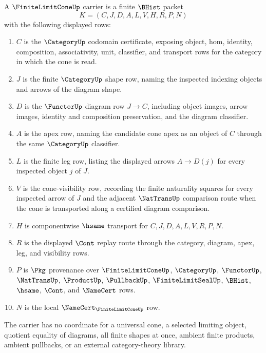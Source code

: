 \begin{definition}
\label{def:finite-limit-cone-carrier}
A $\FiniteLimitConeUp$ carrier is a finite $\BHist$ packet
$$
K=(C,J,D,A,L,V,H,R,P,N)
$$
with the following displayed rows:
\begin{enumerate}
\item $C$ is the $\CategoryUp$ codomain certificate, exposing object, hom, identity, composition, associativity, unit, classifier, and transport rows for the category in which the cone is read.
\item $J$ is the finite $\CategoryUp$ shape row, naming the inspected indexing objects and arrows of the diagram shape.
\item $D$ is the $\FunctorUp$ diagram row $J\to C$, including object images, arrow images, identity and composition preservation, and the diagram classifier.
\item $A$ is the apex row, naming the candidate cone apex as an object of $C$ through the same $\CategoryUp$ classifier.
\item $L$ is the finite leg row, listing the displayed arrows $A\to D(j)$ for every inspected object $j$ of $J$.
\item $V$ is the cone-visibility row, recording the finite naturality squares for every inspected arrow of $J$ and the adjacent $\NatTransUp$ comparison route when the cone is transported along a certified diagram comparison.
\item $H$ is componentwise $\hsame$ transport for $C,J,D,A,L,V,R,P,N$.
\item $R$ is the displayed $\Cont$ replay route through the category, diagram, apex, leg, and visibility rows.
\item $P$ is $\Pkg$ provenance over $\FiniteLimitConeUp$, $\CategoryUp$, $\FunctorUp$, $\NatTransUp$, $\ProductUp$, $\PullbackUp$, $\FiniteLimitSealUp$, $\BHist$, $\hsame$, $\Cont$, and $\NameCert$ rows.
\item $N$ is the local $\NameCert_{\FiniteLimitConeUp}$ row.
\end{enumerate}
The carrier has no coordinate for a universal cone, a selected limiting object, quotient equality of diagrams, all finite shapes at once, ambient finite products, ambient pullbacks, or an external category-theory library.
\end{definition}


